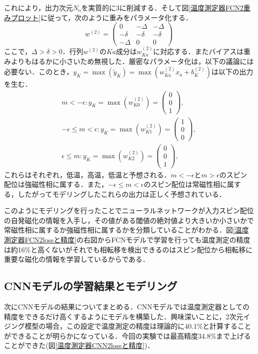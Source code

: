 \documentclass[a4paper,11pt]{jsreport}
\begin{document}
これにより，出力次元$N_{\text{o}}$を実質的に3に削減する．そして図\ref{温度測定器FCN2重みプロット}に従って，次のように重みをパラメータ化する．
\begin{equation}
  w^{(2)} =
  \begin{pmatrix}
    0       & -\Delta & -\Delta \\
    -\delta & -\delta & -\delta \\
    -\Delta & 0       & 0
  \end{pmatrix}
\end{equation}
ここで，$\Delta > \delta > 0$．行列$w^{(2)}$の$Ka$成分は$w_{Ka}^{(2)}$に対応する．またバイアスは重みよりもはるかに小さいため無視した．厳密なパラメータ化は，以下の議論には必要ない．このとき，$y_K = \max{(\tilde{y}_K)}=\max{(w_{Ka}^{(2)}x_a+b_K^{(2)})}$は以下の出力を生む．
\begin{align}
  m<-\epsilon : y_K = \max(w_{K0}^{(2)}) =
  \begin{pmatrix}
    0 \\ 0 \\ 1
  \end{pmatrix}, \\
  -\epsilon \leq m < \epsilon : y_K = \max(w_{K1}^{(2)}) =
  \begin{pmatrix}
    1 \\ 0 \\ 0
  \end{pmatrix}, \\
  \epsilon \leq m : y_K = \max(w_{K2}^{(2)}) =
  \begin{pmatrix}
    0 \\ 0 \\ 1
  \end{pmatrix},
\end{align}
これらはそれぞれ，低温，高温，低温と予想される．$m<-\epsilon$と$m>\epsilon$のスピン配位は強磁性相に属する．また，$-\epsilon \leq m < \epsilon$のスピン配位は常磁性相に属する，したがってモデリングしたこれらの出力は正しく予想されている．\par
このようにモデリングを行ったことでニューラルネットワークが入力スピン配位の自発磁化の情報を入手し，その値がある閾値の絶対値より大きいか小さいかで常磁性相に属するか強磁性相に属するかを分類していることがわかる．図\ref{温度測定器FCN2lossと精度}の右図からFCNモデルで学習を行っても温度測定の精度は約16\%と高くないがそれでも相転移を検出できるのはスピン配位から相転移に重要な磁化の情報を学習しているからである．



\subsection{CNNモデルの学習結果とモデリング}
次にCNNモデルの結果についてまとめる．CNNモデルでは温度測定器としての精度をできるだけ高くするようにモデルを構築した．興味深いことに，2次元イジング模型の場合，この設定で温度測定の精度は理論的に40.1\%と計算することができることが明らかになっている\cite{aoki2018}．今回の実験では最高精度34.8\%まで上げることができた(図\ref{温度測定器CNN2lossと精度})．
\end{document}
